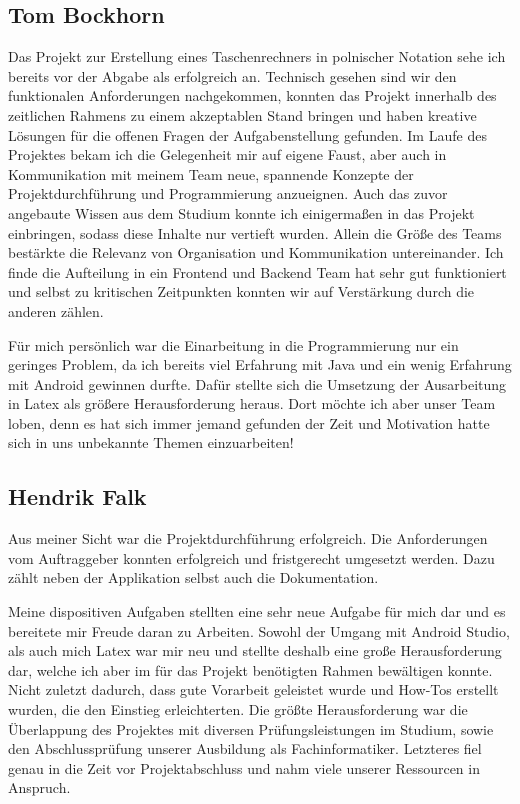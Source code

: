 \clearpage

\subsection{Tom Bockhorn}
Das Projekt zur Erstellung eines Taschenrechners in polnischer Notation sehe ich bereits vor der Abgabe als erfolgreich an. Technisch gesehen sind wir den funktionalen Anforderungen nachgekommen, konnten das Projekt innerhalb des zeitlichen Rahmens zu einem akzeptablen Stand bringen und haben kreative Lösungen für die offenen Fragen der Aufgabenstellung gefunden. Im Laufe des Projektes bekam ich die Gelegenheit mir auf eigene Faust, aber auch in Kommunikation mit meinem Team neue, spannende Konzepte der Projektdurchführung und Programmierung anzueignen. Auch das zuvor angebaute Wissen aus dem Studium konnte ich einigermaßen in das Projekt einbringen, sodass diese Inhalte nur vertieft wurden. Allein die Größe des Teams bestärkte die Relevanz von Organisation und Kommunikation untereinander. Ich finde die Aufteilung in ein Frontend und Backend Team hat sehr gut funktioniert und selbst zu kritischen Zeitpunkten konnten wir auf Verstärkung durch die anderen zählen.

Für mich persönlich war die Einarbeitung in die Programmierung nur ein geringes Problem, da ich bereits viel Erfahrung mit Java und ein wenig Erfahrung mit Android gewinnen durfte. Dafür stellte sich die Umsetzung der Ausarbeitung in Latex als größere Herausforderung heraus. Dort möchte ich aber unser Team loben, denn es hat sich immer jemand gefunden der Zeit und Motivation hatte sich in uns unbekannte Themen einzuarbeiten!

\clearpage

\subsection{Hendrik Falk}
Aus meiner Sicht war die Projektdurchführung erfolgreich. Die Anforderungen vom Auftraggeber konnten erfolgreich und fristgerecht umgesetzt werden. Dazu zählt neben der Applikation selbst auch die Dokumentation. 

Meine dispositiven Aufgaben stellten eine sehr neue Aufgabe für mich dar und es bereitete mir Freude daran zu Arbeiten. Sowohl der Umgang mit Android Studio, als auch mich Latex war mir neu und stellte deshalb eine große Herausforderung dar, welche ich aber im für das Projekt benötigten Rahmen bewältigen konnte. Nicht zuletzt dadurch, dass gute Vorarbeit geleistet wurde und How-Tos erstellt wurden, die den Einstieg erleichterten. Die größte Herausforderung war die Überlappung des Projektes mit diversen Prüfungsleistungen im Studium, sowie den Abschlussprüfung unserer Ausbildung als Fachinformatiker. Letzteres fiel genau in die Zeit vor Projektabschluss und nahm viele unserer Ressourcen in Anspruch. 

